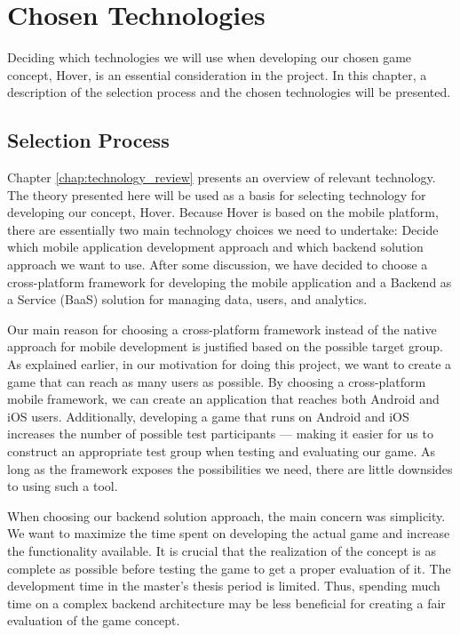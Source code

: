 \documentclass[../Main.tex]{subfiles}
\begin{document}
\section{Chosen Technologies}
\label{chap:chosen_tech}
Deciding which technologies we will use when developing our chosen game concept, Hover, is an essential consideration in the project. In this chapter, a description of the selection process and the chosen technologies will be presented. 

\subsection{Selection Process}
Chapter \ref{chap:technology_review} presents an overview of relevant technology. The theory presented here will be used as a basis for selecting technology for developing our concept, Hover. Because Hover is based on the mobile platform, there are essentially two main technology choices we need to undertake: Decide which mobile application development approach and which backend solution approach we want to use. After some discussion, we have decided to choose a cross-platform framework for developing the mobile application and a Backend as a Service (BaaS) solution for managing data, users, and analytics.

Our main reason for choosing a cross-platform framework instead of the native approach for mobile development is justified based on the possible target group. As explained earlier, in our motivation for doing this project, we want to create a game that can reach as many users as possible. By choosing a cross-platform mobile framework, we can create an application that reaches both Android and iOS users. Additionally, developing a game that runs on Android and iOS increases the number of possible test participants — making it easier for us to construct an appropriate test group when testing and evaluating our game. As long as the framework exposes the possibilities we need, there are little downsides to using such a tool.

When choosing our backend solution approach, the main concern was simplicity. We want to maximize the time spent on developing the actual game and increase the functionality available. It is crucial that the realization of the concept is as complete as possible before testing the game to get a proper evaluation of it. The development time in the master’s thesis period is limited. Thus, spending much time on a complex backend architecture may be less beneficial for creating a fair evaluation of the game concept.
\end{document}
